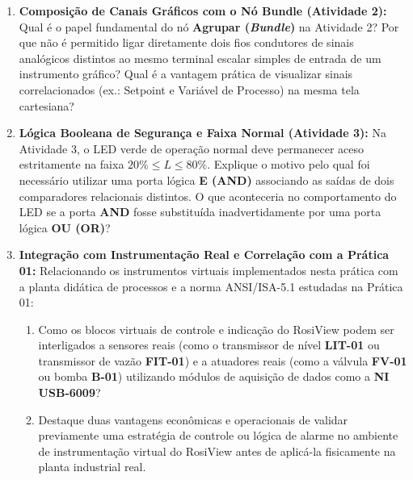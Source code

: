 \documentclass[11pt,a4paper]{article}
\begin{document}
\begin{enumerate}[label=\textbf{Questão \arabic*:}, leftmargin=*, itemsep=4pt, topsep=2pt]
    \item \textbf{Composição de Canais Gráficos com o Nó Bundle (Atividade 2):}
    Qual é o papel fundamental do nó \textbf{Agrupar (\textit{Bundle})} na Atividade 2? Por que não é permitido ligar diretamente dois fios condutores de sinais analógicos distintos ao mesmo terminal escalar simples de entrada de um instrumento gráfico? Qual é a vantagem prática de visualizar sinais correlacionados (ex.: Setpoint e Variável de Processo) na mesma tela cartesiana?

    \item \textbf{Lógica Booleana de Segurança e Faixa Normal (Atividade 3):}
    Na Atividade 3, o LED verde de operação normal deve permanecer aceso estritamente na faixa $20\% \le L \le 80\%$. Explique o motivo pelo qual foi necessário utilizar uma porta lógica \textbf{E (AND)} associando as saídas de dois comparadores relacionais distintos. O que aconteceria no comportamento do LED se a porta \textbf{AND} fosse substituída inadvertidamente por uma porta lógica \textbf{OU (OR)}?

    \item \textbf{Integração com Instrumentação Real e Correlação com a Prática 01:}
    Relacionando os instrumentos virtuais implementados nesta prática com a planta didática de processos e a norma ANSI/ISA-5.1 estudadas na Prática 01:
    \begin{enumerate}[label=\alph*), noitemsep, leftmargin=1.5em]
        \item Como os blocos virtuais de controle e indicação do RosiView podem ser interligados a sensores reais (como o transmissor de nível \textbf{LIT-01} ou transmissor de vazão \textbf{FIT-01}) e a atuadores reais (como a válvula \textbf{FV-01} ou bomba \textbf{B-01}) utilizando módulos de aquisição de dados como a \textbf{NI USB-6009}?
        \item Destaque duas vantagens econômicas e operacionais de validar previamente uma estratégia de controle ou lógica de alarme no ambiente de instrumentação virtual do RosiView antes de aplicá-la fisicamente na planta industrial real.
    \end{enumerate}
\end{enumerate}

\vspace{0.1cm}

\end{document}
